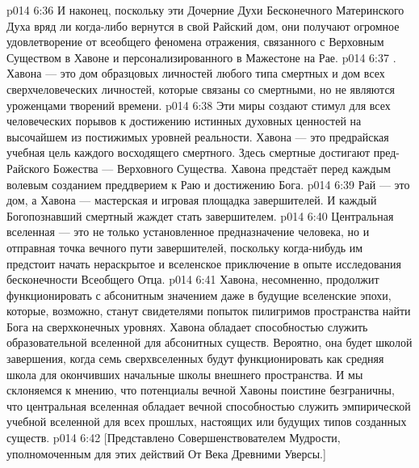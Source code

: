 \vs p014 6:36 И наконец, поскольку эти Дочерние Духи Бесконечного Материнского Духа вряд ли когда\hyp{}либо вернутся в свой Райский дом, они получают огромное удовлетворение от всеобщего феномена отражения, связанного с Верховным Существом в Хавоне и персонализированного в Мажестоне на Рае.
\vs p014 6:37 . Хавона --- это дом образцовых личностей любого типа смертных и дом всех сверхчеловеческих личностей, которые связаны со смертными, но не являются уроженцами творений времени.
\vs p014 6:38 Эти миры создают стимул для всех человеческих порывов к достижению истинных духовных ценностей на высочайшем из постижимых уровней реальности. Хавона --- это предрайская учебная цель каждого восходящего смертного. Здесь смертные достигают пред\hyp{}Райского Божества --- Верховного Существа. Хавона предстаёт перед каждым волевым созданием преддверием к Раю и достижению Бога.
\vs p014 6:39 Рай --- это дом, а Хавона --- мастерская и игровая площадка завершителей. И каждый Богопознавший смертный жаждет стать завершителем.
\vs p014 6:40 Центральная вселенная --- это не только установленное предназначение человека, но и отправная точка вечного пути завершителей, поскольку когда\hyp{}нибудь им предстоит начать нераскрытое и вселенское приключение в опыте исследования бесконечности Всеобщего Отца.
\vs p014 6:41 \pc Хавона, несомненно, продолжит функционировать с абсонитным значением даже в будущие вселенские эпохи, которые, возможно, станут свидетелями попыток пилигримов пространства найти Бога на сверхконечных уровнях. Хавона обладает способностью служить образовательной вселенной для абсонитных существ. Вероятно, она будет школой завершения, когда семь сверхвселенных будут функционировать как средняя школа для окончивших начальные школы внешнего пространства. И мы склоняемся к мнению, что потенциалы вечной Хавоны поистине безграничны, что центральная вселенная обладает вечной способностью служить эмпирической учебной вселенной для всех прошлых, настоящих или будущих типов созданных существ.
\vsetoff
\vs p014 6:42 [Представлено Совершенствователем Мудрости, уполномоченным для этих действий От Века Древними Уверсы.]
\quizlink

